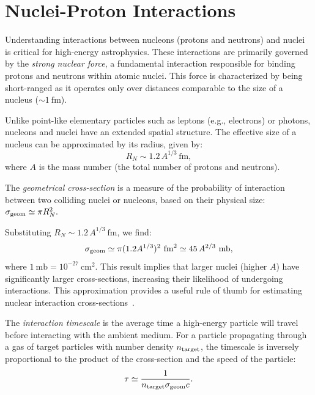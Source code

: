 \section{Nuclei-Proton Interactions}
\label{sec:nucleiproton}

Understanding interactions between nucleons (protons and neutrons) and nuclei is critical for high-energy astrophysics. These interactions are primarily governed by the \emph{strong nuclear force}, a fundamental interaction responsible for binding protons and neutrons within atomic nuclei. This force is characterized by being short-ranged as it operates only over distances comparable to the size of a nucleus (\( \sim 1~\text{fm}\)). 

Unlike point-like elementary particles such as leptons (e.g., electrons) or photons, nucleons and nuclei have an extended spatial structure. The effective size of a nucleus can be approximated by its radius, given by:
\begin{equation}
R_N \sim 1.2 \, A^{1/3} \, \text{fm},
\end{equation}
where \(A\) is the mass number (the total number of protons and neutrons). 

The \emph{geometrical cross-section} is a measure of the probability of interaction between two colliding nuclei or nucleons, based on their physical size:
\(
\sigma_{\rm geom} \simeq \pi R_N^2.
\)

Substituting \(R_N \sim 1.2 \, A^{1/3}~\text{fm}\), we find:
\begin{equation}\label{eq:sgeo}
\sigma_{\rm geom} \simeq \pi (1.2 A^{1/3})^2~\text{fm}^2 \simeq 45 \, A^{2/3}~\text{mb},
\end{equation}
where \(1~\text{mb} = 10^{-27}~\text{cm}^2\). This result implies that larger nuclei (higher \(A\)) have significantly larger cross-sections, increasing their likelihood of undergoing interactions. This approximation provides a useful rule of thumb for estimating nuclear interaction cross-sections~\cite{Letaw1983apjs}. 

The \emph{interaction timescale} is the average time a high-energy particle will travel before interacting with the ambient medium. For a particle propagating through a gas of target particles with number density \(n_{\rm target}\), the timescale is inversely proportional to the product of the cross-section and the speed of the particle:
\begin{equation}
\tau \simeq \frac{1}{n_{\rm target} \sigma_{\rm geom} c}.
\end{equation}

